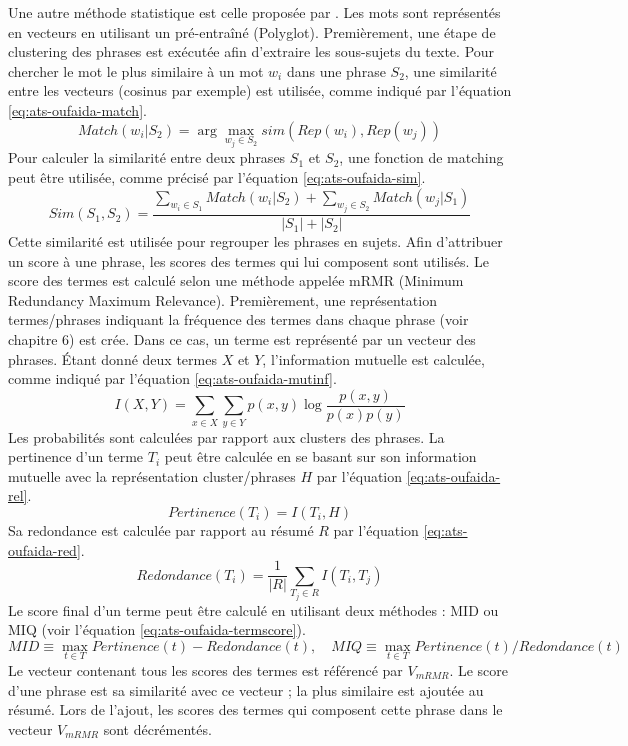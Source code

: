 \documentclass{KodeBook}
\begin{document}
Une autre méthode statistique est celle proposée par \citet{15-oufaida-al}.
Les mots sont représentés en vecteurs en utilisant un  pré-entraîné (Polyglot).
Premièrement, une étape de clustering des phrases est exécutée afin d'extraire les sous-sujets du texte. 
Pour chercher le mot le plus similaire à un mot $w_i$ dans une phrase $S_2$, une similarité entre les vecteurs (cosinus par exemple) est utilisée, comme indiqué par l'équation \ref{eq:ats-oufaida-match}.
\begin{equation}\label{eq:ats-oufaida-match}
Match(w_i | S_2) = \arg\max_{w_j \in S_2} sim(Rep(w_i), Rep(w_j))
\end{equation}
Pour calculer la similarité entre deux phrases $S_1$ et $S_2$, une fonction de matching peut être utilisée, comme précisé par l'équation \ref{eq:ats-oufaida-sim}.
\begin{equation}\label{eq:ats-oufaida-sim}
Sim(S_1, S_2) = \frac{\sum_{w_i \in S_1} Match(w_i | S_2) + \sum_{w_j \in S_2} Match(w_j | S_1)}{|S_1| + |S_2|}
\end{equation}
Cette similarité est utilisée pour regrouper les phrases en sujets. 
Afin d'attribuer un score à une phrase, les scores des termes qui lui composent sont utilisés. 
Le score des termes est calculé selon une méthode appelée mRMR (Minimum Redundancy Maximum Relevance). 
Premièrement, une représentation termes/phrases indiquant la fréquence des termes dans chaque phrase (voir chapitre 6) est crée. 
Dans ce cas, un terme est représenté par un vecteur des phrases. 
Étant donné deux termes $X$ et $Y$, l'information mutuelle est calculée, comme indiqué par l'équation \ref{eq:ats-oufaida-mutinf}.
\begin{equation}\label{eq:ats-oufaida-mutinf}
I(X, Y) = \sum\limits_{x \in X} \sum\limits_{y \in Y} p(x, y) \log \frac{p(x, y)}{p(x) p(y)}
\end{equation}
Les probabilités sont calculées par rapport aux clusters des phrases.
La pertinence d'un terme $T_i$ peut être calculée en se basant sur son information mutuelle avec la représentation cluster/phrases $H$ par l'équation \ref{eq:ats-oufaida-rel}.
\begin{equation}\label{eq:ats-oufaida-rel}
Pertinence(T_i) = I(T_i, H)
\end{equation}
Sa redondance est calculée par rapport au résumé $R$ par l'équation \ref{eq:ats-oufaida-red}.
\begin{equation}\label{eq:ats-oufaida-red}
Redondance(T_i) = \frac{1}{|R|} \sum\limits_{T_j \in R} I(T_i, T_j)
\end{equation}
Le score final d'un terme peut être calculé en utilisant deux méthodes : MID ou MIQ (voir l'équation \ref{eq:ats-oufaida-termscore}).
\begin{equation}\label{eq:ats-oufaida-termscore}
MID \equiv \max_{t \in T} Pertinence(t) - Redondance(t), \quad
MIQ \equiv \max_{t \in T} Pertinence(t) / Redondance(t)
\end{equation}
Le vecteur contenant tous les scores des termes est référencé par $V_{mRMR}$. 
Le score d'une phrase est sa similarité avec ce vecteur ; la plus similaire est ajoutée au résumé. 
Lors de l'ajout, les scores des termes qui composent cette phrase dans le vecteur $V_{mRMR}$ sont décrémentés. 
\end{document}
